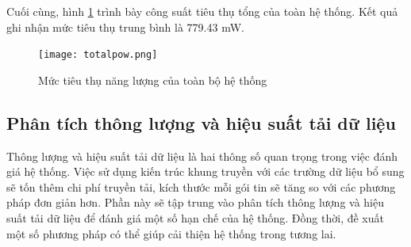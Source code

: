 Cuối cùng, hình \ref{fig:totalpow} trình bày công suất tiêu thụ tổng của toàn hệ thống. Kết quả ghi nhận mức tiêu thụ trung bình là 779.43 mW.
\begin{figure}[H]
    \centering
    \texttt{[image: totalpow.png]}
    \caption{Mức tiêu thụ năng lượng của toàn bộ hệ thống}
    \label{fig:totalpow}
\end{figure}

\subsection{Phân tích thông lượng và hiệu suất tải dữ liệu}
\label{sec:put}
Thông lượng và hiệu suất tải dữ liệu là hai thông số quan trọng trong việc đánh giá hệ thống. Việc sử dụng kiến trúc khung truyền với các trường dữ liệu bổ sung sẽ tốn thêm chi phí truyền tải, kích thước mỗi gói tin sẽ tăng so với các phương pháp đơn giản hơn. Phần này sẽ tập trung vào phân tích thông lượng và hiệu suất tải dữ liệu để đánh giá một số hạn chế của hệ thống. Đồng thời, đề xuất một số phương pháp có thể giúp cải thiện hệ thống trong tương lai.


